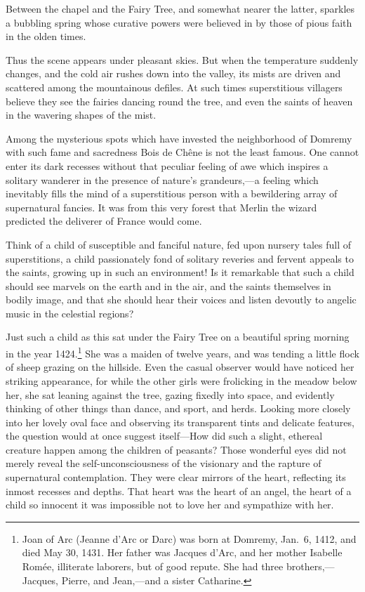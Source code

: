 Between the chapel and the Fairy Tree, and somewhat nearer the latter,
sparkles a bubbling spring whose curative powers were believed in by
those of pious faith in the olden times.

Thus the scene appears under pleasant skies. But when the temperature
suddenly changes, and the cold air rushes down into the valley, its
mists are driven and scattered among the mountainous defiles. At such
times superstitious villagers believe they see the fairies dancing round
the tree, and even the saints of heaven in the wavering shapes of the
mist.

Among the mysterious spots which have invested the neighborhood of
Domremy with such fame and sacredness Bois de Chêne is not the least
famous. One cannot enter its dark recesses without that peculiar feeling
of awe which inspires a solitary wanderer in the presence of nature's
grandeurs,---a feeling which inevitably fills the mind of a
superstitious person with a bewildering array of supernatural fancies.
It was from this very forest that Merlin the wizard predicted the
deliverer of France would come.

Think of a child of susceptible and fanciful nature, fed upon nursery
tales full of superstitions, a child passionately fond of solitary
reveries and fervent appeals to the saints, growing up in such an
environment! Is it remarkable that such a child should see marvels on
the earth and in the air, and the saints themselves in bodily image, and
that she should hear their voices and listen devoutly to angelic music
in the celestial regions?

Just such a child as this sat under the Fairy Tree on a beautiful spring
morning in the year 1424.\footnote{Joan of Arc (Jeanne d'Arc or Darc)
  was born at Domremy, Jan.~6, 1412, and died May 30, 1431. Her father
  was Jacques d'Arc, and her mother Isabelle Romée, illiterate laborers,
  but of good repute. She had three brothers,---Jacques, Pierre, and
  Jean,---and a sister Catharine.} She was a maiden of twelve years, and
was tending a little flock of sheep grazing on the hillside. Even the
casual observer would have noticed her striking appearance, for while
the other girls were frolicking in the meadow below her, she sat leaning
against the tree, gazing fixedly into space, and evidently thinking of
other things than dance, and sport, and herds. Looking more closely into
her lovely oval face and observing its transparent tints and delicate
features, the question would at once suggest itself---How did such a
slight, ethereal creature happen among the children of peasants? Those
wonderful eyes did not merely reveal the self-unconsciousness of the
visionary and the rapture of supernatural contemplation. They were clear
mirrors of the heart, reflecting its inmost recesses and depths. That
heart was the heart of an angel, the heart of a child so innocent it was
impossible not to love her and sympathize with her.

